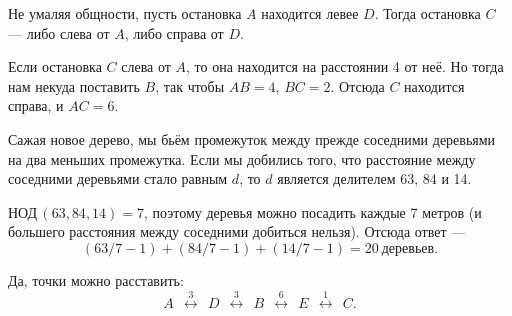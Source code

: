 \begin{itemize}

\itA Не умаляя общности, пусть остановка $A$ находится левее $D$. Тогда остановка $C$ — либо слева от $A$, либо справа от $D$.

Если остановка $C$ слева от $A$, то она находится на расстоянии 4 от неё. Но тогда нам некуда поставить $B$, так чтобы $AB=4$, $BC=2$. Отсюда $C$ находится справа, и $AC=6$.

\itB Сажая новое дерево, мы бьём промежуток между прежде соседними деревьями на два меньших промежутка. Если мы добились того, что расстояние между соседними деревьями стало равным $d$, то $d$ является делителем 63, 84 и 14.

$\text{НОД}\,(63,84,14)=7$, поэтому деревья можно посадить каждые 7 метров (и большего расстояния между соседними добиться нельзя). Отсюда ответ —
$$(63/7-1)+(84/7-1)+(14/7-1) = 20\ \text{деревьев}.$$

\def\disbetw#1{\ \ \stackrel{#1}{\longleftrightarrow}\ \ }

\itC Да, точки можно расставить:
$$A \disbetw 3 D \disbetw 3 B \disbetw 6 E \disbetw 1 C.$$
\end{itemize}